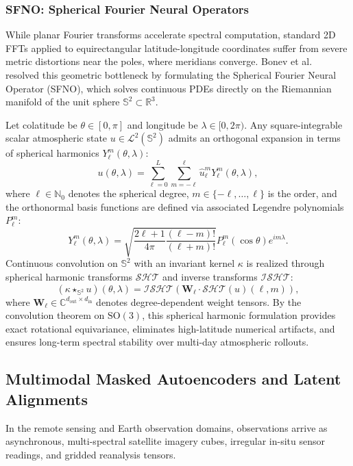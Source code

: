 \subsubsection{SFNO: Spherical Fourier Neural Operators}
While planar Fourier transforms accelerate spectral computation, standard 2D FFTs applied to equirectangular latitude-longitude coordinates suffer from severe metric distortions near the poles, where meridians converge. Bonev et al.~\cite{bonev2023sfno} resolved this geometric bottleneck by formulating the Spherical Fourier Neural Operator (SFNO), which solves continuous PDEs directly on the Riemannian manifold of the unit sphere $\mathbb{S}^2 \subset \mathbb{R}^3$.

Let colatitude be $\theta \in [0, \pi]$ and longitude be $\lambda \in [0, 2\pi)$. Any square-integrable scalar atmospheric state $u \in \mathcal{L}^2(\mathbb{S}^2)$ admits an orthogonal expansion in terms of spherical harmonics $Y_\ell^m(\theta, \lambda)$:
\begin{equation}
    u(\theta, \lambda) = \sum_{\ell=0}^{L} \sum_{m=-\ell}^{\ell} \hat{u}_\ell^m Y_\ell^m(\theta, \lambda),
\end{equation}
where $\ell \in \mathbb{N}_0$ denotes the spherical degree, $m \in \{-\ell, \dots, \ell\}$ is the order, and the orthonormal basis functions are defined via associated Legendre polynomials $P_\ell^m$:
\begin{equation}
    Y_\ell^m(\theta, \lambda) = \sqrt{\frac{2\ell+1}{4\pi} \frac{(\ell-m)!}{(\ell+m)!}} P_\ell^m(\cos \theta) e^{i m \lambda}.
\end{equation}
Continuous convolution on $\mathbb{S}^2$ with an invariant kernel $\kappa$ is realized through spherical harmonic transforms $\mathcal{SHT}$ and inverse transforms $\mathcal{ISHT}$:
\begin{equation}
    (\kappa \star_{\mathbb{S}^2} u)(\theta, \lambda) = \mathcal{ISHT}\left( \mathbf{W}_\ell \cdot \mathcal{SHT}(u)(\ell, m) \right),
\end{equation}
where $\mathbf{W}_\ell \in \mathbb{C}^{d_{\text{out}} \times d_{\text{in}}}$ denotes degree-dependent weight tensors. By the convolution theorem on $\mathrm{SO}(3)$, this spherical harmonic formulation provides exact rotational equivariance, eliminates high-latitude numerical artifacts, and ensures long-term spectral stability over multi-day atmospheric rollouts.

\subsection{Multimodal Masked Autoencoders and Latent Alignments}
In the remote sensing and Earth observation domains, observations arrive as asynchronous, multi-spectral satellite imagery cubes, irregular in-situ sensor readings, and gridded reanalysis tensors.

